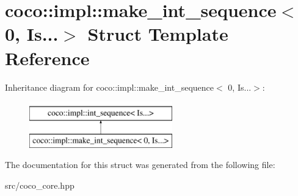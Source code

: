 \hypertarget{structcoco_1_1impl_1_1make__int__sequence_3_010_00_01_is_8_8_8_4}{}\section{coco\+:\+:impl\+:\+:make\+\_\+int\+\_\+sequence$<$ 0, Is...$>$ Struct Template Reference}
\label{structcoco_1_1impl_1_1make__int__sequence_3_010_00_01_is_8_8_8_4}
Inheritance diagram for coco\+:\+:impl\+:\+:make\+\_\+int\+\_\+sequence$<$ 0, Is...$>$\+:\begin{figure}[H]
\begin{center}
\leavevmode
\includegraphics[height=2.000000cm]{structcoco_1_1impl_1_1make__int__sequence_3_010_00_01_is_8_8_8_4}
\end{center}
\end{figure}


The documentation for this struct was generated from the following file\+:\begin{DoxyCompactItemize}
\item 
src/coco\+\_\+core.\+hpp\end{DoxyCompactItemize}
